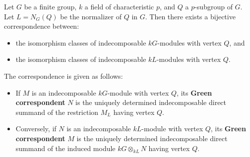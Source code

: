 Let $G$ be a finite group, $k$ a field of characteristic $p$, and $Q$ a $p$-subgroup of $G$. Let $L = N_G(Q)$ be the normalizer of $Q$ in $G$. Then there exists a bijective correspondence between:
\begin{itemize}
\item the isomorphism classes of indecomposable $kG$-modules with vertex $Q$, and
\item the isomorphism classes of indecomposable $kL$-modules with vertex $Q$.
\end{itemize}
The correspondence is given as follows:
\begin{itemize}
\item If $M$ is an indecomposable $kG$-module with vertex $Q$, its \textbf{Green correspondent} $N$ is the uniquely determined indecomposable direct summand of the restriction $M_L$ having vertex $Q$.
\item Conversely, if $N$ is an indecomposable $kL$-module with vertex $Q$, its \textbf{Green correspondent} $M$ is the uniquely determined indecomposable direct summand of the induced module $kG \otimes_{kL} N$ having vertex $Q$.
\end{itemize}
